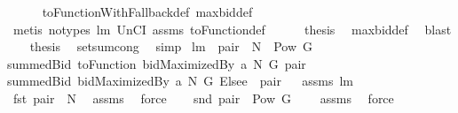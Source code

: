 \begin{isabellebody}
\ \ \ \ \isamarkupfalse%
\ toFunctionWithFallback{}{\isacharunderscore}def\ maxbid{\isacharunderscore}def\isanewline
\ \ \ \ \isamarkupfalse%
\ {\isacharparenleft}metis\ {\isacharparenleft}no{\isacharunderscore}types{\isacharparenright}\ lm{}{}\ UnCI\ assms{\isacharparenleft}{}{\isacharparenright}\ toFunction{\isacharunderscore}def{\isacharparenright}\isanewline
\ \ \ \ \isamarkupfalse%
\ {\isacharquery}thesis\ \isamarkupfalse%
\ maxbid{\isacharunderscore}def\ \isamarkupfalse%
\ blast\isanewline
\ \ \isamarkupfalse%
\isanewline
\isacommand{{\isacharbraceright}}\isamarkupfalse%
\isanewline
{}\isamarkupfalse%
\ {\isacharquery}thesis\ \isamarkupfalse%
\ setsum{\isachardot}cong\ \isamarkupfalse%
\ simp\isanewline
{}\isamarkupfalse%
%
\endisatagproof
{\isafoldproof}%
%
\isadelimproof
\isanewline
%
\endisadelimproof
\isanewline
{}\isamarkupfalse%
\ lm{}{}{\isacharcolon}\ \ {\isachardoublequoteopen}pair\ {\isasymin}\ N\ {\isasymtimes}\ {\isacharparenleft}Pow\ G\ {\isacharminus}\ {\isacharbraceleft}{\isacharbraceleft}{\isacharbraceright}{\isacharbraceright}{\isacharparenright}{\isachardoublequoteclose}\ \ \isanewline
{\isachardoublequoteopen}summedBid\ {\isacharparenleft}toFunction\ {\isacharparenleft}bidMaximizedBy\ a\ N\ G{\isacharparenright}{\isacharparenright}\ pair\ {\isacharequal}\ \isanewline
summedBid\ {\isacharparenleft}{\isacharparenleft}bidMaximizedBy\ a\ N\ G{\isacharparenright}\ Elsee\ {}{\isacharparenright}\ pair{\isachardoublequoteclose}%
\isadelimproof
\ %
\endisadelimproof
%
\isatagproof
{}\isamarkupfalse%
\ assms\ lm{}{}\ \isanewline
{}\isamarkupfalse%
\ {\isacharminus}\ \isanewline
{}\isamarkupfalse%
\ {\isachardoublequoteopen}fst\ pair\ {\isasymin}\ N{\isachardoublequoteclose}\ \isamarkupfalse%
\ assms\ \isamarkupfalse%
\ force\ \isanewline
{}\isamarkupfalse%
\ \isamarkupfalse%
\ {\isachardoublequoteopen}snd\ pair\ {\isasymin}\ Pow\ G\ {\isacharminus}\ {\isacharbraceleft}{\isacharbraceleft}{\isacharbraceright}{\isacharbraceright}{\isachardoublequoteclose}\ \isamarkupfalse%
\ assms{\isacharparenleft}{}{\isacharparenright}\ \isamarkupfalse%
\ force\isanewline

\end{isabellebody}
